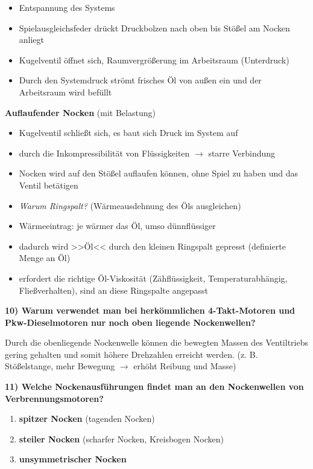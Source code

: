 \begin{itemize}
\item
  Entspannung des Systems
\item
  Spielausgleichsfeder drückt Druckbolzen nach oben bis Stößel am Nocken
  anliegt
\item
  Kugelventil öffnet sich, Raumvergrößerung im Arbeitsraum (Unterdruck)
\item
  Durch den Systemdruck strömt frisches Öl von außen ein und der
  Arbeitsraum wird befüllt
\end{itemize}

\textbf{Auflaufender Nocken} (mit Belastung)

\begin{itemize}
\item
  Kugelventil schließt sich, es baut sich Druck im System auf
\item
  durch die Inkompressibilität von Flüssigkeiten $\to$ starre
  Verbindung
\item
  Nocken wird auf den Stößel auflaufen können, ohne Spiel zu haben und
  das Ventil betätigen
\item
  \emph{Warum Ringspalt?} (Wärmeausdehnung des Öls ausgleichen)
\item
  Wärmeeintrag: je wärmer das Öl, umso dünnflüssiger
\item
  dadurch wird >>Öl<< durch den kleinen Ringspalt gepresst (definierte
  Menge an Öl)
\item
  erfordert die richtige Öl-Viskosität (Zähflüssigkeit,
  Temperaturabhängig, Fließverhalten), sind an diese Ringspalte
  angepasst
\end{itemize}

\textbf{10) Warum verwendet man bei herkömmlichen 4-Takt-Motoren und
Pkw-Dieselmotoren nur noch oben liegende Nockenwellen?}

Durch die obenliegende Nockenwelle können die bewegten Massen des
Ventiltriebs gering gehalten und somit höhere Drehzahlen erreicht
werden. (z. B. Stößelstange, mehr Bewegung $\to$ erhöht Reibung und
Masse)

\textbf{11) Welche Nockenausführungen findet man an den Nockenwellen von
Verbrennungsmotoren?}

\begin{enumerate}
\item
  \textbf{spitzer Nocken} (tagenden Nocken)
\item
  \textbf{steiler Nocken} (scharfer Nocken, Kreisbogen Nocken)
\item
  \textbf{unsymmetrischer Nocken}
\end{enumerate}


